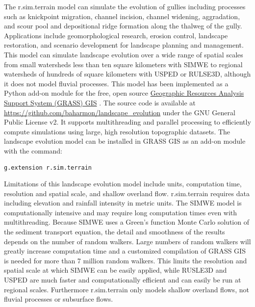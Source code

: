 \documentclass[gmd, manuscript]{copernicus}
\begin{document}
The r.sim.terrain model
can simulate the evolution of gullies
including processes such as 
knickpoint migration,
channel incision, 
channel widening, 
aggradation, and
scour pool and 
depositional ridge formation
along the thalweg of the gully. 
Applications include 
geomorphological research,
erosion control, 
landscape restoration, 
and scenario development 
for landscape planning and management.
This model can simulate landscape evolution 
over a wide range of spatial scales 
from small watersheds 
less than ten square kilometers
with SIMWE
to regional watersheds
of hundreds of square kilometers
with USPED or RULSE3D,
although it does not model fluvial processes. 
This model has been implemented 
as a Python add-on module 
for the free, open source
\href{https://grass.osgeo.org/}{Geographic Resources Analysis Support System (GRASS) GIS}
\citep{GRASS}. 
The source code is available at 
\url{https://github.com/baharmon/landscape\_evolution} 
under the GNU General Public License v2.
It supports multithreading and parallel processing
to efficiently compute simulations 
using large, high resolution topographic datasets.
%
The landscape evolution model 
can be installed in GRASS GIS as an add-on module 
with the command: 
\begin{verbatim}
g.extension r.sim.terrain
\end{verbatim}

Limitations of this landscape evolution model include
units, computation time, resolution and spatial scale,
and shallow overland flow.
r.sim.terrain requires data including 
elevation and rainfall intensity in metric units. 
The SIMWE model is computationally intensive 
and may require long computation times even with multithreading.
Because SIMWE uses a Green's function Monte Carlo solution 
of the sediment transport equation, 
the detail and smoothness of the results 
depends on the number of random walkers.
Large numbers of random walkers will greatly increase computation time
and a customized compilation of GRASS GIS 
is needed for more than 7 million random walkers.
This limits the resolution and spatial scale 
at which SIMWE can be easily applied,
while RUSLE3D and USPED are much faster and computationally efficient
and can easily be run at regional scales. 
Furthermore r.sim.terrain only models shallow overland flows, 
not fluvial processes or subsurface flows. 
\end{document}
